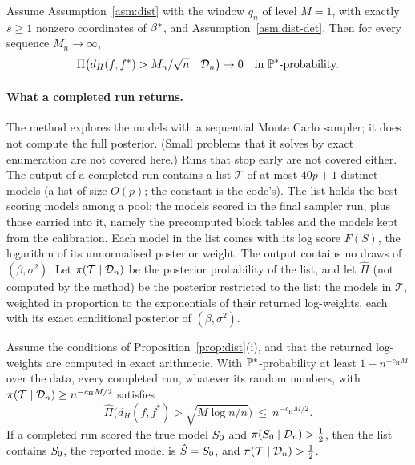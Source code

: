 \begin{theorem}\label{thm:dist-param}
Assume Assumption~\ref{asm:dist} with the window $q_n$ of level $M=1$, with exactly $s\ge1$ nonzero coordinates of $\bstar$,
and Assumption~\ref{asm:dist-det}. Then for every sequence $M_n\to\infty$,
\[
  \Pi\big(d_H(f,f^*)>M_n/\sqrt n\ \big|\ \Dn\big)\to0\quad\text{in $\P^*$-probability.}
\]
\end{theorem}


\paragraph{What a completed run returns.} The method explores the models with a sequential Monte Carlo sampler; it does
not compute the full posterior. (Small problems that it solves by exact enumeration are not covered here.) Runs that stop
early are not covered either. The output of a completed run contains a list $\mathcal T$ of at most $40p+1$ distinct
models (a list of size $O(p)$; the constant is the code's). The list holds the best-scoring models among a pool: the
models scored in the final sampler run, plus those carried into it, namely the precomputed block tables and the models
kept from the calibration. Each model in the list comes with its log score $F(S)$, the logarithm of its unnormalised
posterior weight. The output
contains no draws of $(\beta,\sigma^2)$. Let $\pi(\mathcal T\mid\Dn)$ be the posterior probability of the list, and let
$\hat\Pi$ (not computed by the method) be the posterior restricted to the list: the models in $\mathcal T$, weighted in
proportion to the exponentials of their returned log-weights, each with its exact conditional posterior of
$(\beta,\sigma^2)$.


\begin{corollary}\label{cor:dist-output}
Assume the conditions of Proposition~\ref{prop:dist}(i), and that the returned log-weights are computed in exact arithmetic.
With $\P^*$-probability at least $1-n^{-c_{\mathrm H} M}$ over the data, every completed run, whatever its random numbers, with
$\pi(\mathcal T\mid\Dn)\ge n^{-c_{\mathrm H} M/2}$ satisfies
\[
  \hat\Pi\Big(d_H(f,f^*)>\sqrt{M\log n/n}\Big)\ \le\ n^{-c_{\mathrm H} M/2}.
\]
If a completed run scored the true model $\Sz$ and $\pi(\Sz\mid\Dn)>\tfrac12$, then the list contains $\Sz$, the
reported model is $\Shat=\Sz$, and $\pi(\mathcal T\mid\Dn)>\tfrac12$.
\end{corollary}

